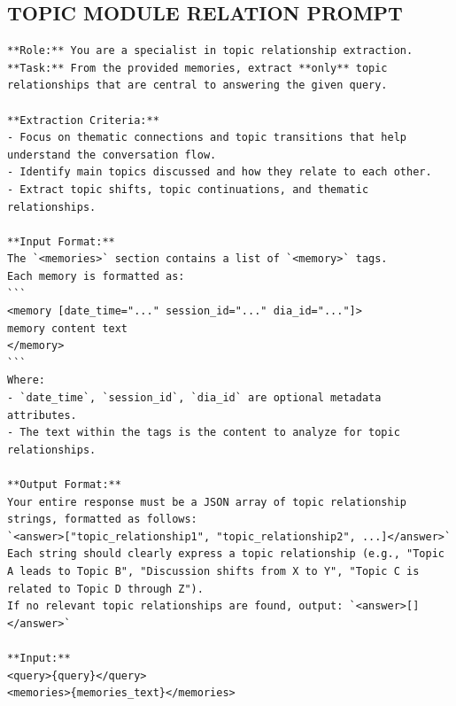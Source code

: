 \subsection{TOPIC MODULE RELATION PROMPT}

\begin{center}
\begin{tcolorbox}[title={TOPIC MODULE RELATION PROMPT (Low)}]
\begin{Verbatim}[breaklines, breakanywhere,fontfamily=tt, fontseries=b, baselinestretch=0.95]
**Role:** You are a specialist in topic relationship extraction.
**Task:** From the provided memories, extract **only** topic relationships that are central to answering the given query.

**Extraction Criteria:**
- Focus on thematic connections and topic transitions that help understand the conversation flow.
- Identify main topics discussed and how they relate to each other.
- Extract topic shifts, topic continuations, and thematic relationships.

**Input Format:**
The `<memories>` section contains a list of `<memory>` tags.
Each memory is formatted as:
```
<memory [date_time="..." session_id="..." dia_id="..."]>
memory content text
</memory>
```
Where:
- `date_time`, `session_id`, `dia_id` are optional metadata attributes.
- The text within the tags is the content to analyze for topic relationships.

**Output Format:**
Your entire response must be a JSON array of topic relationship strings, formatted as follows:
`<answer>["topic_relationship1", "topic_relationship2", ...]</answer>`
Each string should clearly express a topic relationship (e.g., "Topic A leads to Topic B", "Discussion shifts from X to Y", "Topic C is related to Topic D through Z").
If no relevant topic relationships are found, output: `<answer>[]</answer>`

**Input:**
<query>{query}</query>
<memories>{memories_text}</memories>
\end{Verbatim}
\end{tcolorbox}
\end{center}


